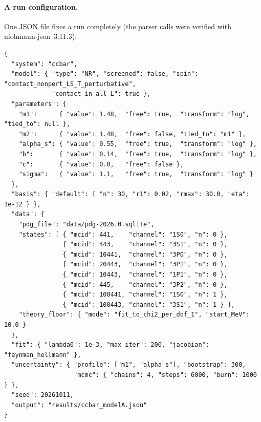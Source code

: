 \documentclass[11pt,a4paper]{article}
\numberwithin{equation}{section}
\theoremstyle{definition}
\theoremstyle{plain}
\theoremstyle{remark}
\numberwithin{algorithm}{section}
\begin{document}
\paragraph{A run configuration.} One JSON file fixes a run completely (the parser calls were verified with nlohmann-json~3.11.3):
\begin{lstlisting}[style=plain]
{
  "system": "ccbar",
  "model": { "type": "NR", "screened": false, "spin": "contact_nonpert_LS_T_perturbative",
             "contact_in_all_L": true },
  "parameters": {
    "m1":      { "value": 1.48,  "free": true,  "transform": "log", "tied_to": null },
    "m2":      { "value": 1.48,  "free": false, "tied_to": "m1" },
    "alpha_s": { "value": 0.55,  "free": true,  "transform": "log" },
    "b":       { "value": 0.14,  "free": true,  "transform": "log" },
    "c":       { "value": 0.0,   "free": false },
    "sigma":   { "value": 1.1,   "free": true,  "transform": "log" }
  },
  "basis": { "default": { "n": 30, "r1": 0.02, "rmax": 30.0, "eta": 1e-12 } },
  "data": {
    "pdg_file": "data/pdg-2026.0.sqlite",
    "states": [ { "mcid": 441,    "channel": "1S0", "n": 0 },
                { "mcid": 443,    "channel": "3S1", "n": 0 },
                { "mcid": 10441,  "channel": "3P0", "n": 0 },
                { "mcid": 20443,  "channel": "3P1", "n": 0 },
                { "mcid": 10443,  "channel": "1P1", "n": 0 },
                { "mcid": 445,    "channel": "3P2", "n": 0 },
                { "mcid": 100441, "channel": "1S0", "n": 1 },
                { "mcid": 100443, "channel": "3S1", "n": 1 } ],
    "theory_floor": { "mode": "fit_to_chi2_per_dof_1", "start_MeV": 10.0 }
  },
  "fit": { "lambda0": 1e-3, "max_iter": 200, "jacobian": "feynman_hellmann" },
  "uncertainty": { "profile": ["m1", "alpha_s"], "bootstrap": 300,
                   "mcmc": { "chains": 4, "steps": 6000, "burn": 1000 } },
  "seed": 20261011,
  "output": "results/ccbar_modelA.json"
}
\end{lstlisting}

\end{document}
